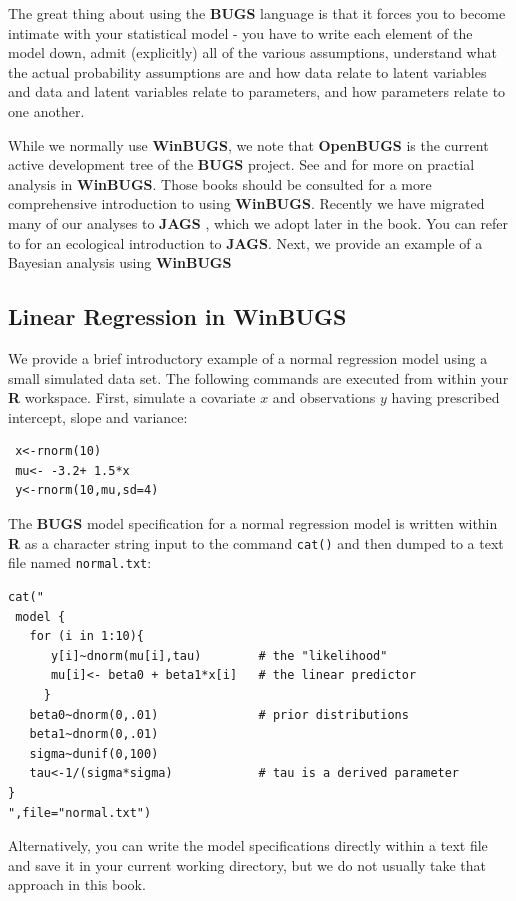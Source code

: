 The great thing about using the {\bf BUGS} language is that it forces
you to become intimate with your statistical model - you have to write
each element of the model down, admit (explicitly) all of the various
assumptions, understand what the actual probability assumptions are
and how data relate to latent variables and data and latent variables
relate to parameters, and how parameters relate to one another.

While we normally use {\bf WinBUGS}, we note that {\bf OpenBUGS} is
the current active development tree of the {\bf BUGS} project. See
\citet[][]{kery:2010} and \citet[][especially
App. 1]{kery_schaub:2011} for more on practial analysis in {\bf
  WinBUGS}.  Those books should be consulted for a more comprehensive
introduction to using {\bf WinBUGS}.  Recently we have migrated many
of our analyses to {\bf JAGS} \citep{plummer:2009}, which we adopt
later in the book. You can refer to \citet{hobbs:2011} for an
ecological introduction to {\bf JAGS}.  Next, we provide an example of
a Bayesian analysis using {\bf WinBUGS}

\subsection{Linear Regression in WinBUGS}

We provide a brief introductory example of a normal regression model
using a small simulated data set. The following commands are executed
from within your {\bf R} workspace.
First, simulate a covariate $x$ and observations $y$ having
prescribed intercept, slope and variance:
\begin{verbatim}
 x<-rnorm(10)
 mu<- -3.2+ 1.5*x
 y<-rnorm(10,mu,sd=4)
\end{verbatim}
The {\bf BUGS} model specification for a normal regression model is
written within {\bf R} as a character string input to the command
\mbox{\tt cat()} and
then dumped to a text file named \mbox{\tt normal.txt}:
\begin{verbatim}
cat("
 model {
   for (i in 1:10){
      y[i]~dnorm(mu[i],tau)        # the "likelihood"
      mu[i]<- beta0 + beta1*x[i]   # the linear predictor
     }
   beta0~dnorm(0,.01)              # prior distributions
   beta1~dnorm(0,.01)
   sigma~dunif(0,100)
   tau<-1/(sigma*sigma)            # tau is a derived parameter
}
",file="normal.txt")
\end{verbatim}
Alternatively, you
can write the model specifications directly within a text file and
save it in your current working directory, but we do not usually take
that approach in this book.

